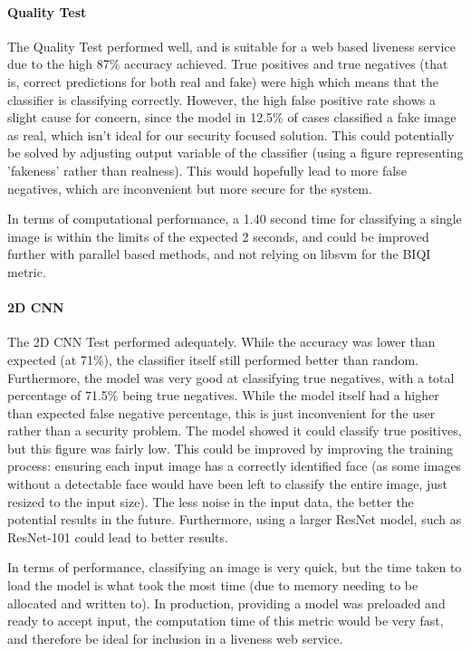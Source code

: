 \documentclass[10pt,a4paper]{article}
\begin{document}
        \paragraph{Quality Test}
            The Quality Test performed well, and is suitable for a web based liveness service due to the high 87\% accuracy achieved.
            True positives and true negatives (that is, correct predictions for both real and fake) were high which means that the classifier
            is classifying correctly. However, the high false positive rate shows a slight cause for concern, since the model in 12.5\% of cases
            classified a fake image as real, which isn't ideal for our security focused solution. This could potentially be solved by adjusting output
            variable of the classifier (using a figure representing 'fakeness' rather than realness). This would hopefully lead to more false negatives,
            which are inconvenient but more secure for the system.

            In terms of computational performance, a 1.40 second time for classifying a single image is within the limits of the expected 2 seconds, and could be improved further
            with parallel based methods, and not relying on libsvm for the BIQI metric.
        \paragraph{2D CNN}
            The 2D CNN Test performed adequately. While the accuracy was lower than expected (at 71\%), the classifier itself still performed better than random.
            Furthermore, the model was very good at classifying true negatives, with a total percentage of 71.5\% being true negatives. While the model itself had
            a higher than expected false negative percentage, this is just inconvenient for the user rather than a security problem. The model showed it could classify true
            positives, but this figure was fairly low. This could be improved by improving the training process: ensuring each input image has a correctly identified face (as
            some images without a detectable face would have been left to classify the entire image, just resized to the input size). The less noise in the input data, the better the potential
            results in the future. Furthermore, using a larger ResNet model, such as ResNet-101 could lead to better results.

            In terms of performance, classifying an image is very quick, but the time taken to load the model is what took the most time (due to memory needing to be allocated and written to).
            In production, providing a model was preloaded and ready to accept input, the computation time of this metric would be very fast, and therefore be ideal for inclusion in a liveness web service.
        
\end{document}
